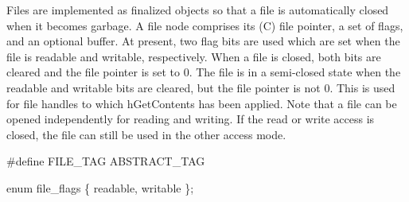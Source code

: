 \nwendcode{}\nwdocspar
Files are implemented as finalized objects so that a file is
automatically closed when it becomes garbage. A file node comprises
its (C) file pointer, a set of flags, and an optional buffer. At
present, two flag bits are used which are set when the file is
readable and writable, respectively. When a file is closed, both bits
are cleared and the file pointer is set to {\Tt{}0\nwendquote}. The file is in a
semi-closed state when the readable and writable bits are cleared, but
the file pointer is not {\Tt{}0\nwendquote}. This is used for file handles to which
{\Tt{}hGetContents\nwendquote} has been applied. Note that a file can be opened
independently for reading and writing. If the read or write access is
closed, the file can still be used in the other access mode.

\nwenddocs{}\plusendmoddef\nwstartdeflinemarkup{}\nwenddeflinemarkup
#define FILE_TAG  ABSTRACT_TAG

enum file_flags \{
    readable,
    writable
\};

